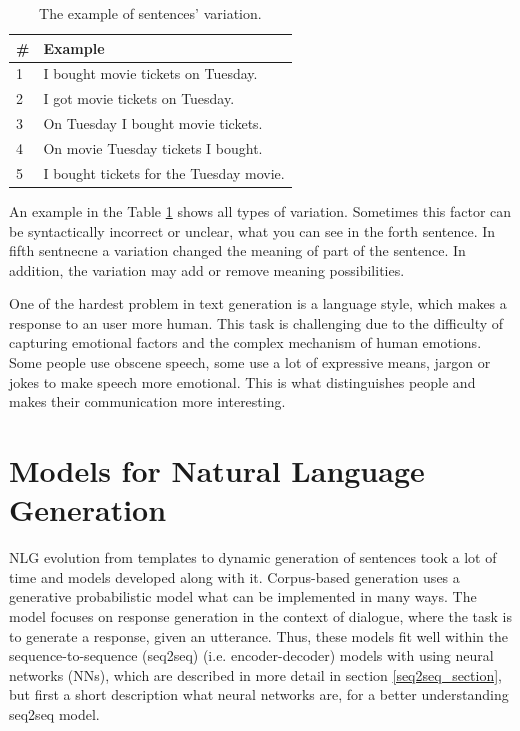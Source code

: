 \begin{table}[ht]
\centering
 \begin{tabular}{|p{0.5cm}|p{8cm}|} 
 \hline
 \# & Example \\
 \hline
 1 & I bought movie tickets on Tuesday. \\ 
 \hline
 2 & I got movie tickets on Tuesday. \\
 \hline
 3 & On Tuesday I bought movie tickets. \\
 \hline
 4 & On movie Tuesday tickets I bought. \\
 \hline
 5 & I bought tickets for the Tuesday movie. \\ 
 \hline
 \end{tabular}
 \caption{The example of sentences' variation.}
\label{tab:var_example}
\end{table}

An example in the Table \ref{tab:var_example} shows all types of variation. Sometimes this factor can be syntactically incorrect or unclear, what you can see in the forth sentence. In fifth sentnecne a variation changed the meaning of part of the sentence. In addition, the variation may add or remove meaning possibilities.


One of the hardest problem in text generation is a language style, which makes a response to an user more human. This task is challenging due to the difficulty of capturing emotional factors and the complex mechanism of human emotions. Some people use obscene speech, some use a lot of expressive means, jargon or jokes to make speech more emotional. This is what distinguishes people and makes their communication more interesting.

\chapter{Models for Natural Language Generation}
NLG evolution from templates to dynamic generation of sentences took a lot of time and models developed along with it. Corpus-based generation uses a generative probabilistic model what can be implemented in many ways. The model focuses on response generation in the context of dialogue, where the task is to generate a response, given an utterance. Thus, these models fit well within the sequence-to-sequence (seq2seq) (i.e. encoder-decoder) models with using neural networks (NNs), which are described in more detail in section \ref{seq2seq_section}, but first a short description what neural networks are, for a better understanding seq2seq model.


